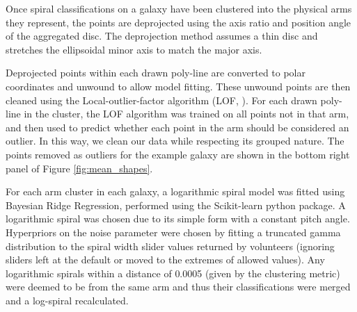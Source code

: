 \documentclass[trackchanges]{aastex63}
\begin{document}
Once spiral classifications on a galaxy have been clustered into the physical arms they represent, the points are deprojected using the axis ratio and position angle of the aggregated disc. The deprojection method assumes a thin disc and stretches the ellipsoidal minor axis to match the major axis.

Deprojected points within each drawn poly-line are converted to polar coordinates and unwound to allow model fitting. These unwound points are then cleaned using the Local-outlier-factor algorithm (LOF, \citealt{local-outlier-factor}). For each drawn poly-line in the cluster, the LOF algorithm was trained on all points not in that arm, and then used to predict whether each point in the arm should be considered an outlier. In this way, we clean our data while respecting its grouped nature. The points removed as outliers for the example galaxy are shown in the bottom right panel of Figure \ref{fig:mean_shapes}.

\begin{figure*}
  \caption{Calculated aggregate components for UGC 4721. The aggregate disc is shown using a dot-dashed line and blue fill in the upper left panel, the aggregate bulge with a dotted line and orange fill in the upper right panel, the aggregate bar using a dashed line and green fill in the lower-left panel and the aggregate spiral arms are plotted as red lines in the lower right panel. S\'ersic components are displayed at twice their effective radii. Black crosses in the lower right panel indicate spiral arm points that were identified as outliers and removed during cleaning (described in Section \ref{sec:spiral_clustering}). The aggregated components agree well with the underlying morphology, despite the noisiness of the classifications received.}
  \label{fig:mean_shapes}
\end{figure*}


For each arm cluster in each galaxy, a logarithmic spiral model was fitted using Bayesian Ridge Regression, performed using the Scikit-learn python package. A logarithmic spiral was chosen due to its simple form with a constant pitch angle. Hyperpriors on the noise parameter were chosen by fitting a truncated gamma distribution \citep{2014arXiv1401.0287Z} to the spiral width slider values returned by volunteers (ignoring sliders left at the default or moved to the extremes of allowed values). Any logarithmic spirals within a distance of 0.0005 (given by the clustering metric) were deemed to be from the same arm and thus their classifications were merged and a log-spiral recalculated.
\end{document}
